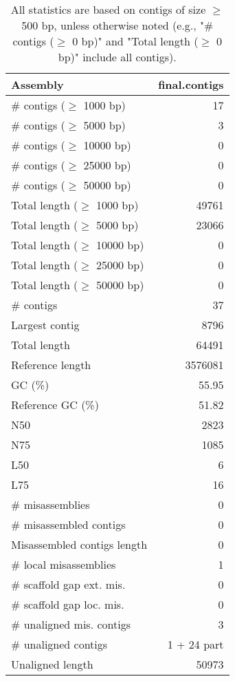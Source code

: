 \documentclass[12pt,a4paper]{article}
\begin{document}
\begin{table}[ht]
\begin{center}
\caption{All statistics are based on contigs of size $\geq$ 500 bp, unless otherwise noted (e.g., "\# contigs ($\geq$ 0 bp)" and "Total length ($\geq$ 0 bp)" include all contigs).}
\begin{tabular}{|l*{1}{|r}|}
\hline
Assembly & final.contigs \\ \hline
\# contigs ($\geq$ 1000 bp) & 17 \\ \hline
\# contigs ($\geq$ 5000 bp) & 3 \\ \hline
\# contigs ($\geq$ 10000 bp) & 0 \\ \hline
\# contigs ($\geq$ 25000 bp) & 0 \\ \hline
\# contigs ($\geq$ 50000 bp) & 0 \\ \hline
Total length ($\geq$ 1000 bp) & 49761 \\ \hline
Total length ($\geq$ 5000 bp) & 23066 \\ \hline
Total length ($\geq$ 10000 bp) & 0 \\ \hline
Total length ($\geq$ 25000 bp) & 0 \\ \hline
Total length ($\geq$ 50000 bp) & 0 \\ \hline
\# contigs & 37 \\ \hline
Largest contig & 8796 \\ \hline
Total length & 64491 \\ \hline
Reference length & 3576081 \\ \hline
GC (\%) & 55.95 \\ \hline
Reference GC (\%) & 51.82 \\ \hline
N50 & 2823 \\ \hline
N75 & 1085 \\ \hline
L50 & 6 \\ \hline
L75 & 16 \\ \hline
\# misassemblies & 0 \\ \hline
\# misassembled contigs & 0 \\ \hline
Misassembled contigs length & 0 \\ \hline
\# local misassemblies & 1 \\ \hline
\# scaffold gap ext. mis. & 0 \\ \hline
\# scaffold gap loc. mis. & 0 \\ \hline
\# unaligned mis. contigs & 3 \\ \hline
\# unaligned contigs & 1 + 24 part \\ \hline
Unaligned length & 50973 \\ \hline

\end{tabular}
\end{center}
\end{table}
\end{document}
